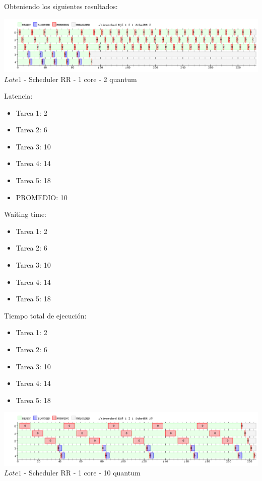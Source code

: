 Obteniendo los siguientes resultados:

\begin{center}

    
	\includegraphics[width=450pt]{./Test/ej5_2.png}
	{$Lote 1$ - Scheduler RR - 1 core - 2 quantum}	
 
\end{center}

\indent Latencia:\
\begin{itemize}
 \item Tarea 1: 2
 \item Tarea 2: 6
 \item Tarea 3: 10
 \item Tarea 4: 14
 \item Tarea 5: 18
 \item PROMEDIO: 10
\end{itemize}
\indent Waiting time:\
\begin{itemize}
 \item Tarea 1: 2
 \item Tarea 2: 6
 \item Tarea 3: 10
 \item Tarea 4: 14
 \item Tarea 5: 18
\end{itemize}
\indent Tiempo total de ejecuci\'{o}n:\
\begin{itemize}
 \item Tarea 1: 2
 \item Tarea 2: 6
 \item Tarea 3: 10
 \item Tarea 4: 14
 \item Tarea 5: 18
\end{itemize}

\begin{center}
  	\includegraphics[width=450pt]{./Test/ej5_10.png}
	  {$Lote 1$ - Scheduler RR - 1 core - 10 quantum}	
\end{center}

